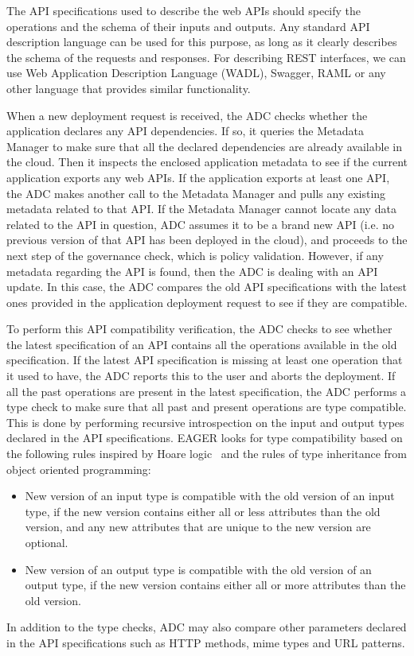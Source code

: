 The API specifications used to describe the web APIs should specify the operations and the schema of their inputs and outputs.
Any standard API description language can be used for this purpose, as long as it clearly describes the schema of the requests and
responses. For describing REST interfaces, we can use Web Application
Description Language (WADL), Swagger, RAML or any other language that provides similar functionality. %

When a new deployment request is received, the ADC checks whether the application declares any API dependencies. If so, it
queries the Metadata Manager to make sure that all the declared dependencies are already available in the cloud. 
Then it inspects the enclosed application metadata to see if the current application exports any web
APIs. If the application exports at least one API, the ADC makes another call to the Metadata Manager and pulls any existing 
metadata related to that API. If
the Metadata Manager cannot locate any data related to the API in question, ADC assumes it to be a brand new
API (i.e. no previous version of that API has been deployed in the cloud), and proceeds to the next step of the governance check, which is policy
validation. However, if any metadata regarding the API is found, then the ADC is dealing with an API update. In this
case, the ADC compares the old API specifications with the latest ones provided in the application deployment request to see if
they are compatible.

To perform this API compatibility verification, the ADC checks to see whether the latest specification of an API contains all 
the operations available in the old specification. If the latest API specification is missing at least one operation that it used to have, the ADC
reports this to the user and aborts the deployment. If all the past operations are present in the latest specification, the ADC performs a 
type check to make sure that 
all past and present operations are type compatible. This is done by performing recursive introspection on the input and output types declared in the
API specifications. EAGER looks for type compatibility based on the following rules inspired by Hoare
logic~\cite{Hoare:1969:ABC:363235.363259} and the rules of type inheritance from object oriented programming:
\begin{itemize}
\item New version of an input type is compatible with the old version of an input type, if the new version contains either all or less attributes than the 
old version, and any new attributes that are unique to the new version are optional.
\item New version of an output type is compatible with the old version of an output type, if the new version contains either all or more attributes than the 
old version.
\end{itemize}
In addition to the type checks, ADC may also compare other parameters declared in the API specifications
such as HTTP methods, mime types and URL patterns.

